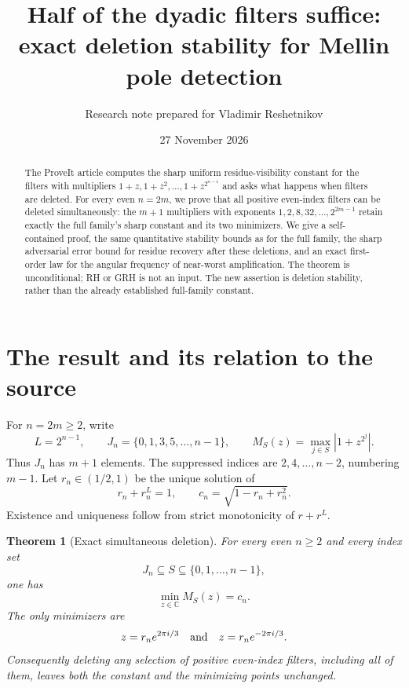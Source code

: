 \documentclass[11pt]{article}
\title{Half of the dyadic filters suffice:\\exact deletion stability for Mellin pole detection}
\author{Research note prepared for Vladimir Reshetnikov}
\date{27 November 2026}
\newtheorem{theorem}{Theorem}[section]
\newcommand{\C}{\mathbb C}
\begin{document}
\maketitle
\begin{abstract}
The ProveIt article computes the sharp uniform residue-visibility constant for the filters with multipliers $1+z,1+z^2,\ldots,1+z^{2^{n-1}}$ and asks what happens when filters are deleted. For every even $n=2m$, we prove that all positive even-index filters can be deleted simultaneously: the $m+1$ multipliers with exponents $1,2,8,32,\ldots,2^{2m-1}$ retain exactly the full family's sharp constant and its two minimizers. We give a self-contained proof, the same quantitative stability bounds as for the full family, the sharp adversarial error bound for residue recovery after these deletions, and an exact first-order law for the angular frequency of near-worst amplification. The theorem is unconditional; RH or GRH is not an input. The new assertion is deletion stability, rather than the already established full-family constant.
\end{abstract}

\section{The result and its relation to the source}

For $n=2m\ge2$, write
\[
 L=2^{n-1},\qquad J_n=\{0,1,3,5,\ldots,n-1\},\qquad
 M_S(z)=\max_{j\in S}|1+z^{2^j}|.
\]
Thus $J_n$ has $m+1$ elements. The suppressed indices are $2,4,\ldots,n-2$, numbering $m-1$.
Let $r_n\in(1/2,1)$ be the unique solution of
\begin{equation}\label{eq:r}
 r_n+r_n^L=1,
 \qquad c_n=\sqrt{1-r_n+r_n^2}.
\end{equation}
Existence and uniqueness follow from strict monotonicity of $r+r^L$.

\begin{theorem}[Exact simultaneous deletion]\label{thm:main}
For every even $n\ge2$ and every index set
\[
 J_n\subseteq S\subseteq\{0,1,\ldots,n-1\},
\]
one has
\begin{equation}\label{eq:main}
 \min_{z\in\C}M_S(z)=c_n.
\end{equation}
The only minimizers are
\[
 z=r_n e^{2\pi i/3}\quad\hbox{and}\quad z=r_n e^{-2\pi i/3}.
\]
Consequently deleting any selection of positive even-index filters, including all of them, leaves both the constant and the minimizing points unchanged.
\end{theorem}
\end{document}
